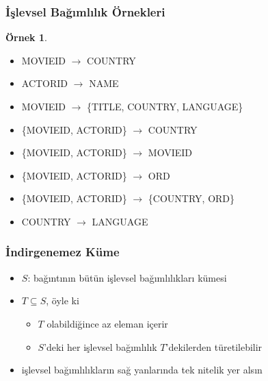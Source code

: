 \documentclass[dvipsnames]{beamer}
\theoremstyle{definition}
\theoremstyle{example}
\newtheorem{ornek}[theorem]{Örnek}
\theoremstyle{plain}
\begin{document}
\begin{frame}
  \frametitle{İşlevsel Bağımlılık Örnekleri}

  \begin{ornek}
    \begin{itemize}
      \item MOVIEID $\rightarrow$ COUNTRY

      \pause
      \item ACTORID $\rightarrow$ NAME

      \pause
      \item MOVIEID $\rightarrow$ \{TITLE, COUNTRY, LANGUAGE\}

      \pause
      \item \{MOVIEID, ACTORID\} $\rightarrow$ COUNTRY

      \pause
      \item \{MOVIEID, ACTORID\} $\rightarrow$ MOVIEID

      \pause
      \item \{MOVIEID, ACTORID\} $\rightarrow$ ORD

      \pause
      \item \{MOVIEID, ACTORID\} $\rightarrow$ \{COUNTRY, ORD\}

      \pause
      \item COUNTRY $\rightarrow$ LANGUAGE
    \end{itemize}
  \end{ornek}
\end{frame}

\begin{frame}
  \frametitle{İndirgenemez Küme}

  \begin{itemize}
    \item $S$: bağıntının bütün işlevsel bağımlılıkları kümesi

    \item $T \subseteq S$, öyle ki
    \begin{itemize}
      \item $T$ olabildiğince az eleman içerir
      \item $S$'deki her işlevsel bağımlılık $T$'dekilerden türetilebilir
    \end{itemize}

    \pause
    \medskip
    \item işlevsel bağımlılıkların sağ yanlarında tek nitelik yer alsın
  \end{itemize}
\end{frame}
\end{document}
